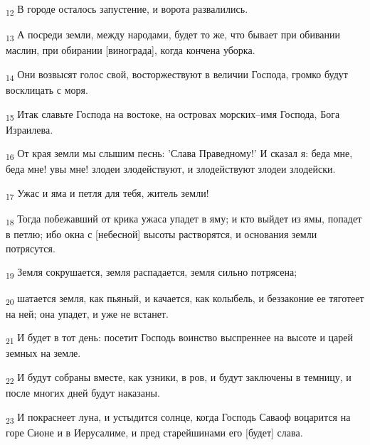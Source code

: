 \begin{tcolorbox}
\textsubscript{12} В городе осталось запустение, и ворота развалились.
\end{tcolorbox}
\begin{tcolorbox}
\textsubscript{13} А посреди земли, между народами, будет то же, что бывает при обивании маслин, при обирании [винограда], когда кончена уборка.
\end{tcolorbox}
\begin{tcolorbox}
\textsubscript{14} Они возвысят голос свой, восторжествуют в величии Господа, громко будут восклицать с моря.
\end{tcolorbox}
\begin{tcolorbox}
\textsubscript{15} Итак славьте Господа на востоке, на островах морских--имя Господа, Бога Израилева.
\end{tcolorbox}
\begin{tcolorbox}
\textsubscript{16} От края земли мы слышим песнь: 'Слава Праведному!' И сказал я: беда мне, беда мне! увы мне! злодеи злодействуют, и злодействуют злодеи злодейски.
\end{tcolorbox}
\begin{tcolorbox}
\textsubscript{17} Ужас и яма и петля для тебя, житель земли!
\end{tcolorbox}
\begin{tcolorbox}
\textsubscript{18} Тогда побежавший от крика ужаса упадет в яму; и кто выйдет из ямы, попадет в петлю; ибо окна с [небесной] высоты растворятся, и основания земли потрясутся.
\end{tcolorbox}
\begin{tcolorbox}
\textsubscript{19} Земля сокрушается, земля распадается, земля сильно потрясена;
\end{tcolorbox}
\begin{tcolorbox}
\textsubscript{20} шатается земля, как пьяный, и качается, как колыбель, и беззаконие ее тяготеет на ней; она упадет, и уже не встанет.
\end{tcolorbox}
\begin{tcolorbox}
\textsubscript{21} И будет в тот день: посетит Господь воинство выспреннее на высоте и царей земных на земле.
\end{tcolorbox}
\begin{tcolorbox}
\textsubscript{22} И будут собраны вместе, как узники, в ров, и будут заключены в темницу, и после многих дней будут наказаны.
\end{tcolorbox}
\begin{tcolorbox}
\textsubscript{23} И покраснеет луна, и устыдится солнце, когда Господь Саваоф воцарится на горе Сионе и в Иерусалиме, и пред старейшинами его [будет] слава.
\end{tcolorbox}
